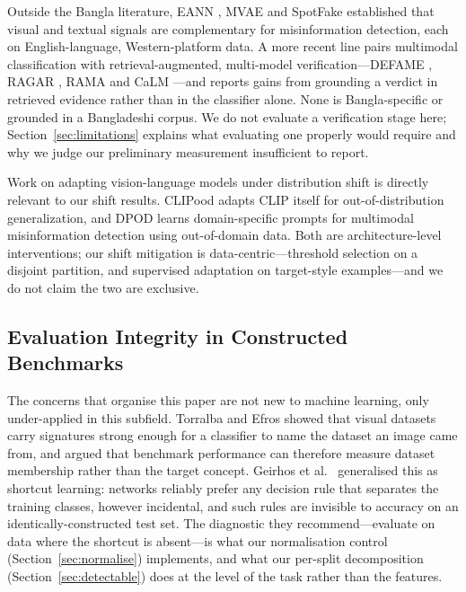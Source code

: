 Outside the Bangla literature, EANN \cite{eann}, MVAE \cite{mvae} and SpotFake
\cite{spotfake} established that visual and textual signals are complementary
for misinformation detection, each on English-language, Western-platform data.
A more recent line pairs multimodal classification with retrieval-augmented,
multi-model verification---DEFAME \cite{defame}, RAGAR \cite{ragar}, RAMA
\cite{rama} and CaLM \cite{calm}---and reports gains from grounding a verdict
in retrieved evidence rather than in the classifier alone. None is
Bangla-specific or grounded in a Bangladeshi corpus. We do not evaluate a
verification stage here; Section~\ref{sec:limitations} explains what
evaluating one properly would require and why we judge our preliminary
measurement insufficient to report.

Work on adapting vision-language models under distribution shift is directly
relevant to our shift results. CLIPood \cite{clipood} adapts CLIP itself for
out-of-distribution generalization, and DPOD \cite{dpod} learns
domain-specific prompts for multimodal misinformation detection using
out-of-domain data. Both are architecture-level interventions; our shift
mitigation is data-centric---threshold selection on a disjoint partition, and
supervised adaptation on target-style examples---and we do not claim the two
are exclusive.

\subsection{Evaluation Integrity in Constructed Benchmarks}
\label{sec:related-integrity}

The concerns that organise this paper are not new to machine learning, only
under-applied in this subfield. Torralba and Efros \cite{datasetbias} showed
that visual datasets carry signatures strong enough for a classifier to name
the dataset an image came from, and argued that benchmark performance can
therefore measure dataset membership rather than the target concept. Geirhos
et al.\ \cite{shortcut} generalised this as shortcut learning: networks
reliably prefer any decision rule that separates the training classes, however
incidental, and such rules are invisible to accuracy on an
identically-constructed test set. The diagnostic they recommend---evaluate on
data where the shortcut is absent---is what our normalisation control
(Section~\ref{sec:normalise}) implements, and what our per-split decomposition
(Section~\ref{sec:detectable}) does at the level of the task rather than the
features.

